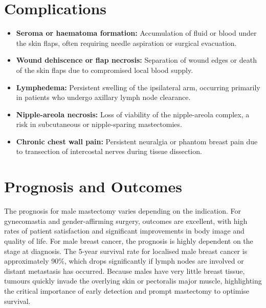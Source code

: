 \section*{Complications}
\begin{itemize}
    \item \textbf{Seroma or haematoma formation:} Accumulation of fluid or blood under the skin flaps, often requiring needle aspiration or surgical evacuation.
    \item \textbf{Wound dehiscence or flap necrosis:} Separation of wound edges or death of the skin flaps due to compromised local blood supply.
    \item \textbf{Lymphedema:} Persistent swelling of the ipsilateral arm, occurring primarily in patients who undergo axillary lymph node clearance.
    \item \textbf{Nipple-areola necrosis:} Loss of viability of the nipple-areola complex, a risk in subcutaneous or nipple-sparing mastectomies.
    \item \textbf{Chronic chest wall pain:} Persistent neuralgia or phantom breast pain due to transection of intercostal nerves during tissue dissection.
\end{itemize}

\section*{Prognosis and Outcomes}
The prognosis for male mastectomy varies depending on the indication. For gynecomastia and gender-affirming surgery, outcomes are excellent, with high rates of patient satisfaction and significant improvements in body image and quality of life. For male breast cancer, the prognosis is highly dependent on the stage at diagnosis. The 5-year survival rate for localised male breast cancer is approximately 90\%, which drops significantly if lymph nodes are involved or distant metastasis has occurred. Because males have very little breast tissue, tumours quickly invade the overlying skin or pectoralis major muscle, highlighting the critical importance of early detection and prompt mastectomy to optimise survival.

